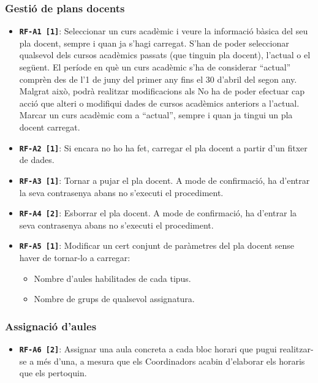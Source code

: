 \documentclass[a4paper,12pt]{ThesisStyle}
\begin{document}
\subsubsection{Gestió de plans docents}
\begin{itemize}
  \item \texttt{\textbf{RF-A1 [1]}}: Seleccionar un curs acadèmic i veure la informació bàsica del seu pla docent, sempre i quan ja s'hagi carregat. S'han de poder seleccionar qualsevol dels cursos acadèmics passats (que tinguin pla docent), l'actual o el següent. El període en què un curs acadèmic s'ha de considerar ``actual'' comprèn des de l'1 de juny del primer any fins el 30 d'abril del segon any. Malgrat això, podrà realitzar modificacions als No ha de poder efectuar cap acció que alteri o modifiqui dades de cursos acadèmics anteriors a l'actual. Marcar un curs acadèmic com a ``actual'', sempre i quan ja tingui un pla docent carregat.
  \item \texttt{\textbf{RF-A2 [1]}}: Si encara no ho ha fet, carregar el pla docent a partir d'un fitxer de dades.
  \item \texttt{\textbf{RF-A3 [1]}}: Tornar a pujar el pla docent. A mode de confirmació, ha d'entrar la seva contrasenya abans no s'executi el procediment.
  \item \texttt{\textbf{RF-A4 [2]}}: Esborrar el pla docent. A mode de confirmació, ha d'entrar la seva contrasenya abans no s'executi el procediment.
  \item \texttt{\textbf{RF-A5 [1]}}: Modificar un cert conjunt de paràmetres del pla docent sense haver de tornar-lo a carregar:
        \begin{itemize}
          \item Nombre d'aules habilitades de cada tipus.
          \item Nombre de grups de qualsevol assignatura.
        \end{itemize}
\end{itemize}

\subsubsection{Assignació d'aules}
\begin{itemize}
  \item \texttt{\textbf{RF-A6 [2]}}: Assignar una aula concreta a cada bloc horari que pugui realitzar-se a més d'una, a mesura que els Coordinadors acabin d'elaborar els horaris que els pertoquin.
\end{itemize}
\end{document}
